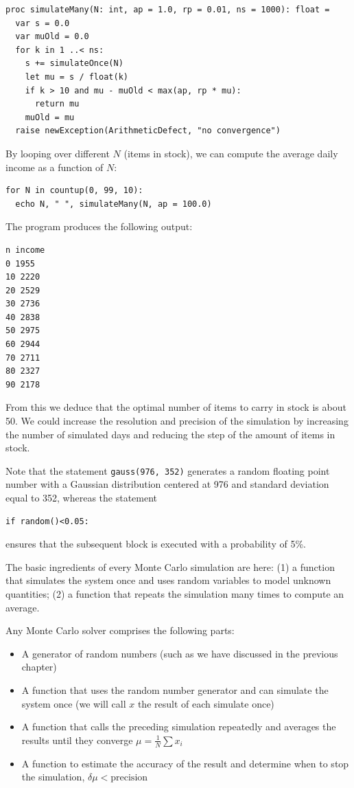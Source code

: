 \documentclass[justified, sixbynine]{tufte-book}
\def\ft{\small\tt}
\theoremstyle{plain}%
\newtheorem * {corollary}{Corollary}
\theoremstyle{definition}
\theoremstyle{remark}
\newtheorem * {remark}{Remark}
\newtheorem * {note}{Note}
\begin{document}
\begin{fullwidth}
\begin{lstlisting}
proc simulateMany(N: int, ap = 1.0, rp = 0.01, ns = 1000): float =
  var s = 0.0
  var muOld = 0.0
  for k in 1 ..< ns:
    s += simulateOnce(N)
    let mu = s / float(k)
    if k > 10 and mu - muOld < max(ap, rp * mu):
      return mu
    muOld = mu
  raise newException(ArithmeticDefect, "no convergence")
\end{lstlisting}

By looping over different $N$ (items in stock), we can compute the average daily income as a function of $N$:
\begin{lstlisting}
for N in countup(0, 99, 10):
  echo N, " ", simulateMany(N, ap = 100.0)
\end{lstlisting}

The program produces the following output:
\begin{lstlisting}
n income
0 1955
10 2220
20 2529
30 2736
40 2838
50 2975
60 2944
70 2711
80 2327
90 2178
\end{lstlisting}

From this we deduce that the optimal number of items to carry in stock is
about 50. We could increase the resolution and precision of the simulation
by increasing the number of simulated days and reducing the step of the
amount of items in stock.

Note that the statement {\ft gauss(976, 352)} generates a random floating
point number with a Gaussian distribution centered at 976 and standard
deviation equal to 352, whereas the statement
\begin{lstlisting}
if random()<0.05:
\end{lstlisting}

ensures that the subsequent block is executed with a probability of 5\%.

The basic ingredients of every Monte Carlo simulation are here: (1) a function that simulates the system once and uses random variables to model unknown quantities; (2) a function that repeats the simulation many times to compute an average.

Any Monte Carlo solver comprises the following parts:

\begin{itemize}
\item A generator of random numbers (such as we have discussed in the previous chapter)
\item A function that uses the random number generator and can simulate the system once (we will call $x$ the result of each simulate once)
\item A function that calls the preceding simulation repeatedly and averages the results until they converge $\mu = \frac1N \sum x_i$
\item A function to estimate the accuracy of the result and determine when to stop the simulation, $\delta\mu < \textrm{precision}$
\end{itemize}


\end{fullwidth}
\end{document}
